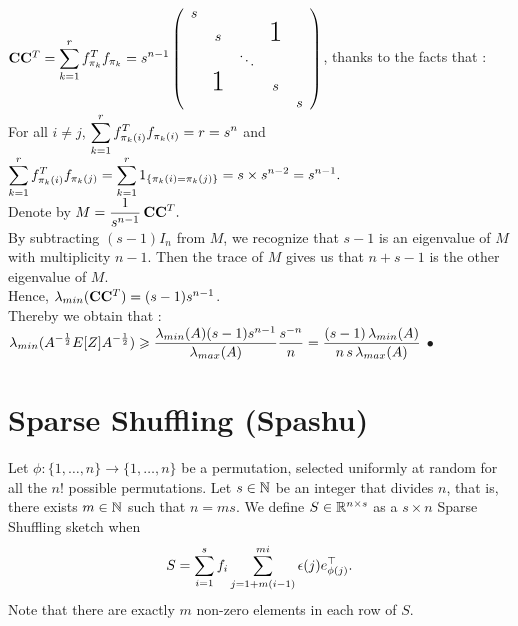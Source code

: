  
 
$\bold{C} \bold{C}^{T}= \dsp\sum\limits_{k=1}^{r} f_{\pi_{k}}^{T} f_{\pi_{k}} = s^{n-1}
    \left(
    \begin{array}{ccccc}
    s                                    \\
      & s             &   & \text{\huge1}\\
      &               & \ddots               \\
      & \text{\huge1} &   & s            \\
      &               &   &   & s
    \end{array}
    \right)$, thanks to the facts that :\\ For all $i\neq j$, $\displaystyle\sum\limits_{k=1}^{r} f_{\pi_{k}(i)}^{T} f_{\pi_{k}(i)} = r = s^{n}$ and $\displaystyle\sum\limits_{k=1}^{r} f_{\pi_{k}(i)}^{T} f_{\pi_{k}(j)} = \displaystyle\sum\limits_{k=1}^{r} 1_{\left\{\pi_{k}(i) = \pi_{k}(j)\right\}} = s \times s^{n-2} = s^{n-1}.$\\
Denote by $\displaystyle M = \frac{1}{s^{n-1}}\, \bold{C} \bold{C}^{T}.$\\

By subtracting $(s-1)I_{n}$ from $M$, we recognize that $s-1$ is an eigenvalue of $M$ with multiplicity $n-1$. Then the trace of $M$ gives us that $n+s-1$ is the other eigenvalue of $M$.\\ 
Hence, $\lambda_{min}(\bold{C} \bold{C}^{T}) = (s-1)s^{n-1}$.\\

Thereby we obtain that :\\ 


$\displaystyle \lambda_{min}(A^{-\frac12}E[Z]A^{-\frac12} )  \geqslant  \frac{\lambda_{min}(A) (s-1)s^{n-1}}{ \lambda_{max}(A)}  \frac{s^{-n}}{n} =  \frac{(s-1)\,\lambda_{min}(A)}{n \, s \,\lambda_{max}(A)} $ $\bullet$


\section{Sparse Shuffling (Spashu)}

Let $\phi: \{1,\ldots, n\} \rightarrow \{1,\ldots, n\}$ be a permutation, selected uniformly at random for all the $n!$ possible permutations. Let $s\in {\mathbb N}$ be an integer that divides $n$, that is, there exists $m \in {\mathbb N}$ such that $n = ms.$ We define $S \in {\mathbb R}^{n \times s}$ as a $s\times n$ Sparse Shuffling sketch when
 \[S = \displaystyle\sum_{i=1}^s f_i \sum_{j=1+m(i-1)}^{mi} \epsilon(j)e_{\phi(j)}^\top.\]
 Note that there are exactly $m$ non-zero elements in each row of $S$.
 
